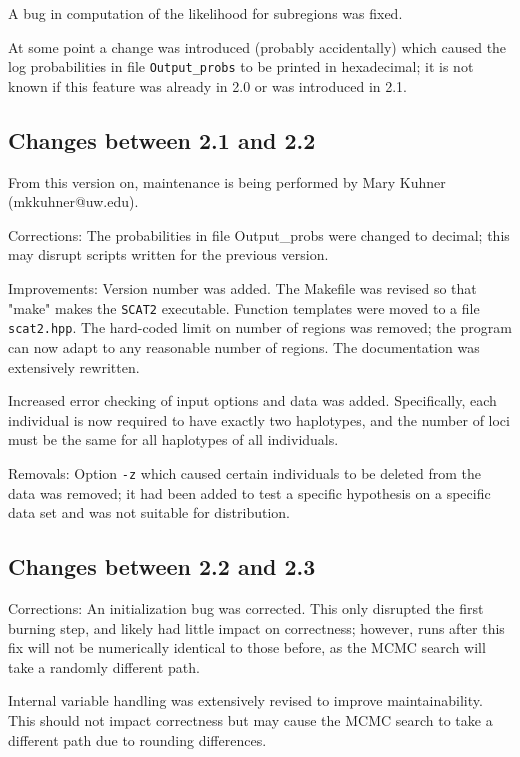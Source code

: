 \documentclass[10pt,titlepage,times,letterpaper]{article}
\def\SCAT{{\tt SCAT2} }
\begin{document}
A bug in computation of the likelihood for subregions was fixed.

At some point a change was introduced (probably accidentally) which caused the log probabilities
in file {\tt Output\_probs} to be printed in hexadecimal; it is not known
if this feature was already in 2.0 or was introduced in 2.1.

\subsection{Changes between 2.1 and 2.2}

From this version on, maintenance is being performed by Mary Kuhner
(mkkuhner@uw.edu).

Corrections: The probabilities in file Output\_probs were
changed to decimal; this may disrupt scripts written for the previous
version. 

Improvements:  
Version number was added. 
The Makefile was revised so that "make" makes the \SCAT executable.
Function templates were moved to a file {\tt scat2.hpp}.
The hard-coded limit on number of regions was removed; the program can
now adapt to any reasonable number of regions.
The documentation was extensively rewritten.

Increased error checking of input options and data was added.  Specifically,
each individual is now required to have exactly two haplotypes, and the
number of loci must be the same for all haplotypes of all individuals.

Removals:
Option {\tt -z} which caused certain individuals to be deleted
from the data was removed; it had been added to test a specific hypothesis
on a specific data set and was not suitable for distribution.


\subsection{Changes between 2.2 and 2.3}

Corrections:  An initialization bug was corrected.  This only disrupted
the first burning step, and likely had little impact on correctness; however,
runs after this fix will not be numerically identical to those before,
as the MCMC search will take a randomly different path.

Internal variable handling was extensively revised to improve maintainability.
This should not impact correctness but may cause the MCMC search to take a
different path due to rounding differences.
\end{document}
